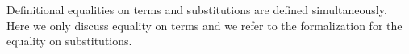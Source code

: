 Definitional equalities on terms and substitutions are defined simultaneously.
Here we only discuss equality on terms and we refer to the formalization for the equality on substitutions.
\begin{AgdaAlign}
\begin{code}%
\>[0][@{}l@{\AgdaIndent{1}}]%
\>[2]\AgdaSpace{}%
\AgdaSpace{}%
\AgdaSymbol{:}\AgdaSpace{}%
\AgdaSpace{}%
\AgdaSymbol{\{}\AgdaSymbol{\}}\AgdaSpace{}%
\AgdaSymbol{\{}\AgdaSpace{}%
\AgdaSymbol{:}\AgdaSpace{}%
\AgdaSpace{}%
\AgdaSymbol{\}}\AgdaSpace{}%
\AgdaSymbol{\{}\AgdaSpace{}%
\AgdaSymbol{:}\AgdaSpace{}%
\AgdaSpace{}%
\AgdaSymbol{\}}\AgdaSpace{}%
\AgdaSpace{}%
\AgdaSpace{}%
\AgdaSpace{}%
\AgdaSpace{}%
\AgdaSpace{}%
\AgdaSpace{}%
\AgdaSpace{}%
\AgdaSpace{}%
\AgdaSpace{}%
\AgdaSpace{}%
\<%
\end{code}


\end{AgdaAlign}
